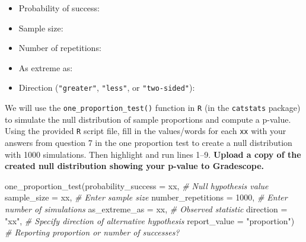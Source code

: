 \documentclass[
]{report}
\newenvironment{Shaded}{\begin{snugshade}}{\end{snugshade}}
\newcommand{\AttributeTok}[1]{\textcolor[rgb]{0.77,0.63,0.00}{#1}}
\newcommand{\CommentTok}[1]{\textcolor[rgb]{0.56,0.35,0.01}{\textit{#1}}}
\newcommand{\DecValTok}[1]{\textcolor[rgb]{0.00,0.00,0.81}{#1}}
\newcommand{\FunctionTok}[1]{\textcolor[rgb]{0.00,0.00,0.00}{#1}}
\newcommand{\NormalTok}[1]{#1}
\newcommand{\StringTok}[1]{\textcolor[rgb]{0.31,0.60,0.02}{#1}}
\providecommand{\tightlist}{%
  \setlength{\itemsep}{0pt}\setlength{\parskip}{0pt}}
\begin{document}
\begin{itemize}
\tightlist
\item
  Probability of success:
\end{itemize}

\vspace{.2in}

\begin{itemize}
\tightlist
\item
  Sample size:
\end{itemize}

\vspace{.2in}

\begin{itemize}
\tightlist
\item
  Number of repetitions:
\end{itemize}

\vspace{.2in}

\begin{itemize}
\tightlist
\item
  As extreme as:
\end{itemize}

\vspace{.2in}

\begin{itemize}
\tightlist
\item
  Direction (\texttt{"greater"}, \texttt{"less"}, or \texttt{"two-sided"}):
\end{itemize}

\vspace{.2in}

We will use the \texttt{one\_proportion\_test()} function in \texttt{R} (in the \texttt{catstats} package) to simulate the null distribution of sample proportions and compute a p-value. Using the provided \texttt{R} script file, fill in the values/words for each \texttt{xx} with your answers from question 7 in the one proportion test to create a null distribution with 1000 simulations. Then highlight and run lines 1--9. \textbf{Upload a copy of the created null distribution showing your p-value to Gradescope.}

\begin{Shaded}
\begin{Highlighting}[]
\FunctionTok{one\_proportion\_test}\NormalTok{(}\AttributeTok{probability\_success =}\NormalTok{ xx, }\CommentTok{\# Null hypothesis value}
          \AttributeTok{sample\_size =}\NormalTok{ xx, }\CommentTok{\# Enter sample size}
          \AttributeTok{number\_repetitions =} \DecValTok{1000}\NormalTok{, }\CommentTok{\# Enter number of simulations}
          \AttributeTok{as\_extreme\_as =}\NormalTok{ xx, }\CommentTok{\# Observed statistic}
          \AttributeTok{direction =} \StringTok{"xx"}\NormalTok{, }\CommentTok{\# Specify direction of alternative hypothesis}
          \AttributeTok{report\_value =} \StringTok{"proportion"}\NormalTok{) }\CommentTok{\# Reporting proportion or number of successes?}
\end{Highlighting}
\end{Shaded}
\end{document}
